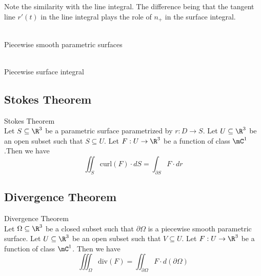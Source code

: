 \documentclass[a4paper]{article}
\begin{document}
Note the similarity with the line integral. The difference being that the tangent line $r'(t)$ in the line integral plays the role of $n_+$ in the surface integral. 

\begin{defn}{}{}\\
Piecewise smooth parametric surfaces
\end{defn}

\begin{defn}{}{}\\
Piecewise surface integral
\end{defn}

\subsection{Stokes Theorem}
\begin{thm}{Stokes Theorem}{}\\
Let $S\subseteq\R^3$ be a parametric surface parametrized by $r:D\to S$. Let $U\subseteq\R^3$ be an open subset such that $S\subseteq U$. Let $F:U\to\R^3$ be a function of class $\mC^1$.Then we have $$\iint_S\text{curl}(F)\cdot dS=\int_{\partial S}F\cdot dr$$
\end{thm}

\subsection{Divergence Theorem}
\begin{thm}{Divergence Theorem}{}\\
Let $\Omega\subseteq\R^3$ be a closed subset such that $\partial\Omega$ is a piecewise smooth parametric surface. Let $U\subseteq\R^3$ be an open subset such that $V\subseteq U$. Let $F:U\to\R^3$ be a function of class $\mC^1$. Then we have $$\iiint_\Omega\text{div}(F)=	\iint_{\partial\Omega}F\cdot d(\partial\Omega)$$
\end{thm}
\end{document}
